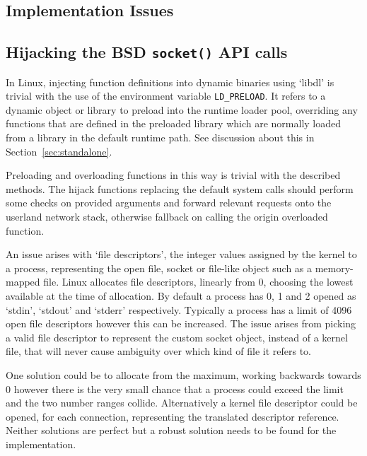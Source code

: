 \documentclass[11pt,a4paper,british]{bhamarticle}
\begin{document}
\begin{multicols}{2}

\section{Implementation Issues}
\subsection{Hijacking the BSD \texttt{socket()} API calls} %
In Linux, injecting function definitions into dynamic binaries using `libdl' is trivial with the use of the environment variable \texttt{LD\_PRELOAD}. It refers to a dynamic object or library to preload into the runtime loader pool, overriding any functions that are defined in the preloaded library which are normally loaded from a library in the default runtime path. See discussion about this in Section~\ref{sec:standalone}.

Preloading and overloading functions in this way is trivial with the described methods. The hijack functions replacing the default system calls should perform some checks on provided arguments and forward relevant requests onto the userland network stack, otherwise fallback on calling the origin overloaded function.

An issue arises with `file descriptors', the integer values assigned by the kernel to a process, representing the open file, socket or file-like object such as a memory-mapped file. Linux allocates file descriptors, linearly from 0, choosing the lowest available at the time of allocation. By default a process has 0, 1 and 2 opened as `stdin', `stdout' and `stderr' respectively. Typically a process has a limit of 4096 open file descriptors however this can be increased. The issue arises from picking a valid file descriptor to represent the custom socket object, instead of a kernel file, that will never cause ambiguity over which kind of file it refers to.

One solution could be to allocate from the maximum, working backwards towards 0 however there is the very small chance that a process could exceed the limit and the two number ranges collide. Alternatively a kernel file descriptor could be opened, for each connection, representing the translated descriptor reference. Neither solutions are perfect but a robust solution needs to be found for the implementation.


\end{multicols}
\end{document}
